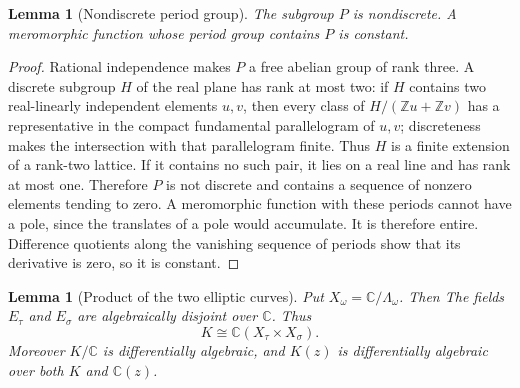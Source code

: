 \documentclass[11pt]{article}
\numberwithin{equation}{section}
\newtheorem{lemma}[theorem]{Lemma}
\theoremstyle{definition}
\theoremstyle{remark}
\newcommand{\C}{\mathbb C}
\newcommand{\Z}{\mathbb Z}
\begin{document}
\begin{lemma}[Nondiscrete period group]
\label{lem:nondiscrete}
The subgroup $P$ is nondiscrete.  A meromorphic function whose period group
contains $P$ is constant.
\end{lemma}

\begin{proof}
Rational independence makes $P$ a free abelian group of rank three.  A
discrete subgroup $H$ of the real plane has rank at most two: if $H$ contains
two real-linearly independent elements $u,v$, then every class of
$H/(\Z u+\Z v)$ has a representative in the compact fundamental
parallelogram of $u,v$; discreteness makes the intersection with that
parallelogram finite.  Thus $H$ is a finite extension of a rank-two lattice.
If it contains no such pair, it lies on a real line and has rank at most one.
Therefore $P$ is not discrete and contains a sequence of nonzero elements
tending to zero.  A
meromorphic function with these periods cannot have a pole, since the
translates of a pole would accumulate.  It is therefore entire.  Difference
quotients along the vanishing sequence of periods show that its derivative
is zero, so it is constant.
\end{proof}

\begin{lemma}[Product of the two elliptic curves]
\label{lem:product-field}
Put $X_\omega=\C/\Lambda_\omega$.  Then
The fields $E_\tau$ and $E_\sigma$ are algebraically disjoint over $\C$.
Thus
\[
 K\cong\C(X_\tau\times X_\sigma).
\]
Moreover $K/\C$ is differentially algebraic, and $K(z)$ is
differentially algebraic over both $K$ and $\C(z)$.
\end{lemma}
\end{document}
